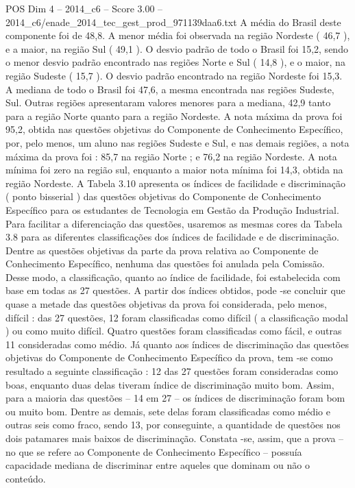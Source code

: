 \begin{textsample}{POS Dim 4 – 2014\_c6 – Score 3.00 – 2014\_c6/enade\_2014\_tec\_gest\_prod\_971139daa6.txt}
A média do Brasil deste componente foi de 48,8.
A menor média foi observada na região Nordeste ( 46,7 ), e a maior, na região Sul ( 49,1 ).
O desvio padrão de todo o Brasil foi 15,2, sendo o menor desvio padrão encontrado nas regiões Norte e Sul ( 14,8 ), e o maior, na região Sudeste ( 15,7 ).
O desvio padrão encontrado na região Nordeste foi 15,3.
A mediana de todo o Brasil foi 47,6, a mesma encontrada nas regiões Sudeste, Sul.
Outras regiões apresentaram valores menores para a mediana, 42,9 tanto para a região Norte quanto para a região Nordeste.
A nota máxima da prova foi 95,2, obtida nas questões objetivas do Componente de Conhecimento Específico, por, pelo menos, um aluno nas regiões Sudeste e Sul, e nas demais regiões, a nota máxima da prova foi : 85,7 na região Norte ; e 76,2 na região Nordeste.
A nota mínima foi zero na região sul, enquanto a maior nota mínima foi 14,3, obtida na região Nordeste.
A Tabela 3.10 apresenta os índices de facilidade e discriminação ( ponto bisserial ) das questões objetivas do Componente de Conhecimento Específico para os estudantes de Tecnologia em Gestão da Produção Industrial.
Para facilitar a diferenciação das questões, usaremos as mesmas cores da Tabela 3.8 para as diferentes classificações dos índices de facilidade e de discriminação.
Dentre as questões objetivas da parte da prova relativa ao Componente de Conhecimento Específico, nenhuma das questões foi anulada pela Comissão.
Desse modo, a classificação, quanto ao índice de facilidade, foi estabelecida com base em todas as 27 questões.
A partir dos índices obtidos, pode -se concluir que quase a metade das questões objetivas da prova foi considerada, pelo menos, difícil : das 27 questões, 12 foram classificadas como difícil ( a classificação modal ) ou como muito difícil.
Quatro questões foram classificadas como fácil, e outras 11 consideradas como médio.
Já quanto aos índices de discriminação das questões objetivas do Componente de Conhecimento Específico da prova, tem -se como resultado a seguinte classificação : 12 das 27 questões foram consideradas como boas, enquanto duas delas tiveram índice de discriminação muito bom.
Assim, para a maioria das questões – 14 em 27 – os índices de discriminação foram bom ou muito bom.
Dentre as demais, sete delas foram classificadas como médio e outras seis como fraco, sendo 13, por conseguinte, a quantidade de questões nos dois patamares mais baixos de discriminação.
Constata -se, assim, que a prova – no que se refere ao Componente de Conhecimento Específico – possuía capacidade mediana de discriminar entre aqueles que dominam ou não o conteúdo.

\end{textsample}
